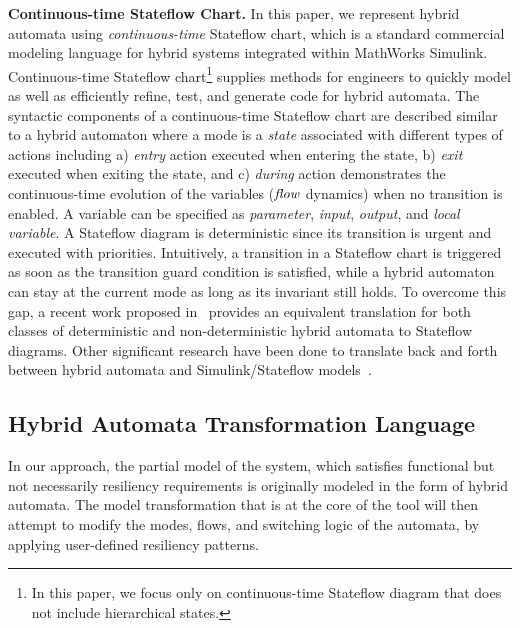 \vspace{0.5em}
\noindent
{\bf Continuous-time Stateflow Chart.}
%
In this paper, we represent hybrid automata using \emph{continuous-time} Stateflow chart, which is a standard commercial modeling language for hybrid systems integrated within MathWorks Simulink.
%
Continuous-time Stateflow chart\footnote{In this paper, we focus only on continuous-time Stateflow diagram that does not include hierarchical states.} supplies methods for engineers to quickly model as well as efficiently refine, test, and generate code for hybrid automata.
%
The syntactic components of a continuous-time Stateflow chart are described similar to a hybrid automaton where a mode is a \emph{state} associated with different types of actions including a) \emph{entry} action executed when entering the state, b) \emph{exit} executed when exiting the state, and c) \emph{during} action demonstrates the continuous-time evolution of the variables (\ie ${\mathit{flow}}$ dynamics) when no transition is enabled. A variable can be specified as \emph{parameter}, \emph{input}, \emph{output}, and \emph{local variable}. A Stateflow diagram is deterministic since its transition is urgent and executed with priorities.
%
Intuitively, a transition in a Stateflow chart is triggered as soon as the transition guard condition is satisfied, while a hybrid automaton can stay at the current mode as long as its invariant still holds.  To overcome this gap, a recent work proposed in~\cite{bak2017hybrid} provides an equivalent translation for both classes of deterministic and non-deterministic hybrid automata to Stateflow diagrams. Other significant research have been done to translate back and forth between hybrid automata and Simulink/Stateflow models~\cite{alur2008symbolic,manamcheri2011step,minopoli2016sl2sx}.

\subsection{Hybrid Automata Transformation Language}
In our approach, the partial model of the system, which satisfies
functional but not necessarily resiliency requirements is originally
modeled in the form of hybrid automata. The model transformation that
is at the core of the \toolreaffirm tool will then attempt to modify
the modes, flows, and switching logic of the automata, by applying
user-defined resiliency patterns.

